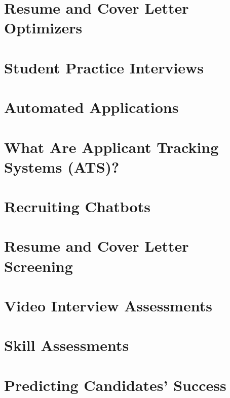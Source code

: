 \documentclass[
]{book}
\begin{document}
\hypertarget{resume-and-cover-letter-optimizers}{%
\chapter{Resume and Cover Letter Optimizers}\label{resume-and-cover-letter-optimizers}}

\hypertarget{student-practice-interviews}{%
\chapter{Student Practice Interviews}\label{student-practice-interviews}}

\hypertarget{automated-applications}{%
\chapter{Automated Applications}\label{automated-applications}}

\hypertarget{what-are-applicant-tracking-systems-ats}{%
\chapter{What Are Applicant Tracking Systems (ATS)?}\label{what-are-applicant-tracking-systems-ats}}

\hypertarget{recruiting-chatbots}{%
\chapter{Recruiting Chatbots}\label{recruiting-chatbots}}

\hypertarget{resume-and-cover-letter-screening}{%
\chapter{Resume and Cover Letter Screening}\label{resume-and-cover-letter-screening}}

\hypertarget{video-interview-assessments}{%
\chapter{Video Interview Assessments}\label{video-interview-assessments}}

\hypertarget{skill-assessments}{%
\chapter{Skill Assessments}\label{skill-assessments}}

\hypertarget{predicting-candidates-success}{%
\chapter{Predicting Candidates' Success}\label{predicting-candidates-success}}
\end{document}
